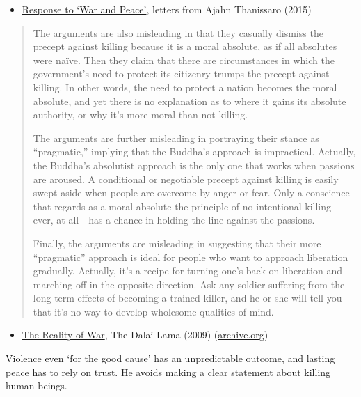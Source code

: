 \begin{itemize}
\tightlist
\item
  \href{https://web.archive.org/web/20151123015056/http://www.inquiringmind.com/Articles/BhikkhuLetters.html}{Response
  to `War and Peace'}, letters from Ajahn Thanissaro (2015)
\end{itemize}

\begin{quote}
The arguments are also misleading in that they casually dismiss the
precept against killing because it is a moral absolute, as if all
absolutes were naïve. Then they claim that there are circumstances in
which the government's need to protect its citizenry trumps the precept
against killing. In other words, the need to protect a nation becomes
the moral absolute, and yet there is no explanation as to where it gains
its absolute authority, or why it's more moral than not killing.

The arguments are further misleading in portraying their stance as
``pragmatic,'' implying that the Buddha's approach is impractical.
Actually, the Buddha's absolutist approach is the only one that works
when passions are aroused. A conditional or negotiable precept against
killing is easily swept aside when people are overcome by anger or fear.
Only a conscience that regards as a moral absolute the principle of no
intentional killing---ever, at all---has a chance in holding the line
against the passions.

Finally, the arguments are misleading in suggesting that their more
``pragmatic'' approach is ideal for people who want to approach
liberation gradually. Actually, it's a recipe for turning one's back on
liberation and marching off in the opposite direction. Ask any soldier
suffering from the long-term effects of becoming a trained killer, and
he or she will tell you that it's no way to develop wholesome qualities
of mind.
\end{quote}

\clearpage

\begin{itemize}
\tightlist
\item
  \href{https://www.dalailama.com/messages/world-peace/the-reality-of-war}{The
  Reality of War}, The Dalai Lama (2009)
  (\href{https://web.archive.org/web/20210526055246/https://www.dalailama.com/messages/world-peace/the-reality-of-war}{archive.org})
\end{itemize}

Violence even `for the good cause' has an unpredictable outcome, and
lasting peace has to rely on trust. He avoids making a clear statement
about killing human beings.

